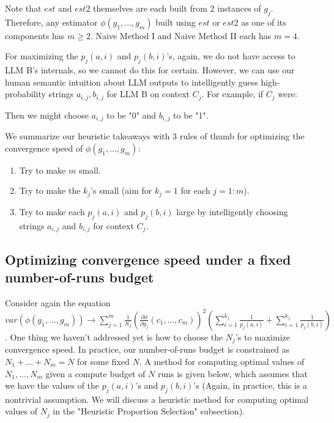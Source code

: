 \documentclass{article}
\begin{document}
Note that $\displaystyle est$ and $\displaystyle est2$ themselves are each built from 2 instances of $\displaystyle g_{j}$. Therefore, any estimator $\displaystyle \phi \left( g_{1} ,...,g_{m}\right)$ built using $\displaystyle est$ or $\displaystyle est2$ as one of its components has $\displaystyle m\geqslant 2$. Naive Method I and Naive Method II each has $\displaystyle m=4$.



For maximizing the $\displaystyle p_{j}\left( a,i\right)$ and $\displaystyle p_{j}\left( b,i\right)$'s, again, we do not have access to LLM B's internals, so we cannot do this for certain. However, we can use our human semantic intuition about LLM outputs to intelligently guess high-probability strings $\displaystyle a_{i,j} ,b_{i,j}$ for LLM B on context $\displaystyle C_{j}$. For example, if $\displaystyle C_{j}$ were:

Then we might choose $\displaystyle a_{i,j}$ to be "0" and $\displaystyle b_{i,j}$ to be "1".



We summarize our heuristic takeaways with 3 rules of thumb for optimizing the convergence speed of $\displaystyle \phi \left( g_{1} ,...,g_{m}\right)$:
\begin{enumerate}
\item Try to make $\displaystyle m$ small.
\item Try to make the $\displaystyle k_{j}$'s small (aim for $\displaystyle k_{j} =1$ for each $\displaystyle j=1:m$).
\item Try to make each $\displaystyle p_{j}\left( a,i\right)$ and $\displaystyle p_{j}\left( b,i\right)$ large by intelligently choosing strings $\displaystyle a_{i,j}$ and $\displaystyle b_{i,j}$ for context $\displaystyle C_{j}$.
\end{enumerate}



\subsection{Optimizing convergence speed under a fixed number-of-runs budget}

Consider again the equation $\displaystyle var\left( \phi \left( g_{1} ,...,g_{m}\right)\right)\rightarrow \sum _{j=1}^{m}\frac{1}{N_{j}}\left(\frac{\partial \phi }{\partial g_{j}}\left( c_{1} ,...,c_{m}\right)\right)^{2}\left(\sum _{i=1}^{k_{j}}\frac{1}{p_{j}\left( a,i\right)} +\sum _{i=1}^{k_{j}}\frac{1}{p_{j}\left( b,i\right)}\right)$. One thing we haven't addressed yet is how to choose the $\displaystyle N_{j}$'s to maximize convergence speed. In practice, our number-of-runs budget is constrained as $\displaystyle N_{1} +...+N_{m} =N$ for some fixed $\displaystyle N$. A method for computing optimal values of $\displaystyle N_{1} ,...,N_{m}$ given a compute budget of $\displaystyle N$ runs is given below, which assumes that we have the values of the $\displaystyle p_{j}\left( a,i\right)$'s and $\displaystyle p_{j}\left( b,i\right)$'s (Again, in practice, this is a nontrivial assumption. We will discuss a heuristic method for computing optimal values of $\displaystyle N_{j}$ in the "Heuristic Proportion Selection" subsection).
\end{document}
